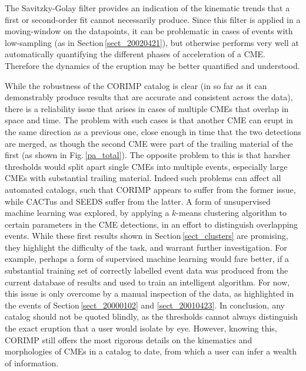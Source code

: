 \documentclass[referee,a4paper,12pt,traditabstract]{swsc}
\begin{document}
\begin{linenumbers}
The Savitzky-Golay filter provides an indication of the kinematic trends that a first or second-order fit cannot necessarily produce. Since this filter is applied in a moving-window on the datapoints, it can be problematic in cases of events with low-sampling (as in Section\,\ref{sect_20020421}), but otherwise performs very well at automatically quantifying the different phases of acceleration of a CME. Therefore the dynamics of the eruption may be better quantified and understood.  

While the robustness of the CORIMP catalog is clear (in so far as it can demonstrably produce results that are accurate and consistent across the data), there is a reliability issue that arises in cases of multiple CMEs that overlap in space and time. The problem with such cases is that another CME can erupt in the same direction as a previous one, close enough in time that the two detections are merged, as though the second CME were part of the trailing material of the first (as shown in Fig.\,\ref{pa_total}). The opposite problem to this is that harsher thresholds would split apart single CMEs into multiple events, especially large CMEs with substantial trailing material. Indeed such problems can affect all automated catalogs, such that CORIMP appears to suffer from the former issue, while CACTus and SEEDS suffer from the latter. A form of unsupervised machine learning was explored, by applying a $k$-means clustering algorithm to certain parameters in the CME detections, in an effort to distinguish overlapping events. While these first results shown in Section\,\ref{sect_clusters} are promising, they highlight the difficulty of the task, and warrant further investigation. For example, perhaps a form of supervised machine learning would fare better, if a substantial training set of correctly labelled event data was produced from the current database of results and used to train an intelligent algorithm. For now, this issue is only overcome by a manual inspection of the data, as highlighted in the events of Section\,\ref{sect_20000102} and \ref{sect_20010423}. In conclusion, any catalog should not be quoted blindly, as the thresholds cannot always distinguish the exact eruption that a user would isolate by eye. However, knowing this, CORIMP still offers the most rigorous details on the kinematics and morphologies of CMEs in a catalog to date, from which a user can infer a wealth of information.



\begin{acknowledgements}
     

\end{acknowledgements}
\end{linenumbers}
\end{document}
